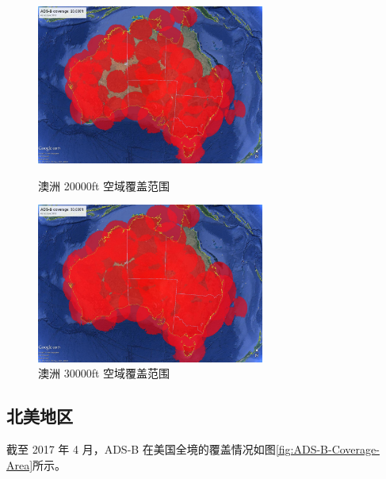 \begin{figure}[!htb]
\centering
\begin{minipage}[t]{0.48\textwidth}
\centering
\includegraphics[width=7.5cm]{pic/ADS-B-20k.jpg}
\caption{澳洲 20000ft 空域覆盖范围\protect\footnotemark}
\label{fig:ADS-B-20k}
\end{minipage}
\begin{minipage}[t]{0.48\textwidth}
\centering
\includegraphics[width=7.5cm]{pic/ADS-B-30k.jpg}
\caption{澳洲 30000ft 空域覆盖范围\protect\footnotemark}
\label{fig:ADS-B-30k}
\end{minipage}
\end{figure}

\subsection{北美地区}

截至 2017 年 4 月，ADS-B 在美国全境的覆盖情况如图\ref{fig:ADS-B-Coverage-Area}所示。

